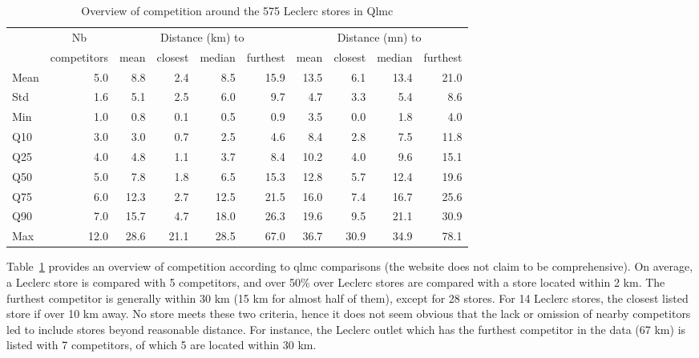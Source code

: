 \documentclass[english]{article}
\begin{document}
\begin{table}[H]
\renewcommand{\arraystretch}{0.7}%
\caption{Overview of competition around the 575 Leclerc stores in Qlmc}\label{tab:qlmc_comp}
\small
    \begin{tabular}{lr|rrrr|rrrr}
    \toprule
    \toprule
          & \multicolumn{1}{c|}{Nb} & \multicolumn{4}{c|}{Distance (km) to} & \multicolumn{4}{c}{Distance (mn) to} \\
          & \multicolumn{1}{c|}{competitors} & \multicolumn{1}{c}{mean} & \multicolumn{1}{c}{closest} & \multicolumn{1}{c}{median} & \multicolumn{1}{c|}{furthest} & \multicolumn{1}{c}{mean} & \multicolumn{1}{c}{closest} & \multicolumn{1}{c}{median} & \multicolumn{1}{c}{furthest} \\
    \midrule
    Mean  & 5.0   & 8.8   & 2.4   & 8.5   & 15.9  & 13.5  & 6.1   & 13.4  & 21.0 \\
    Std   & 1.6   & 5.1   & 2.5   & 6.0   & 9.7   & 4.7   & 3.3   & 5.4   & 8.6 \\
    Min   & 1.0   & 0.8   & 0.1   & 0.5   & 0.9   & 3.5   & 0.0   & 1.8   & 4.0 \\
    Q10   & 3.0   & 3.0   & 0.7   & 2.5   & 4.6   & 8.4   & 2.8   & 7.5   & 11.8 \\
    Q25   & 4.0   & 4.8   & 1.1   & 3.7   & 8.4   & 10.2  & 4.0   & 9.6   & 15.1 \\
    Q50   & 5.0   & 7.8   & 1.8   & 6.5   & 15.3  & 12.8  & 5.7   & 12.4  & 19.6 \\
    Q75   & 6.0   & 12.3  & 2.7   & 12.5  & 21.5  & 16.0  & 7.4   & 16.7  & 25.6 \\
    Q90   & 7.0   & 15.7  & 4.7   & 18.0  & 26.3  & 19.6  & 9.5   & 21.1  & 30.9 \\
    Max   & 12.0  & 28.6  & 21.1  & 28.5  & 67.0  & 36.7  & 30.9  & 34.9  & 78.1 \\
    \bottomrule
    \bottomrule
\end{tabular}
\end{table}

Table~\ref{tab:qlmc_comp} provides an overview of competition according to qlmc comparisons (the website does not claim to be comprehensive). On average, a Leclerc store is compared with 5 competitors, and over 50\% over Leclerc stores are compared with a store located within 2 km. The furthest competitor is generally within 30 km (15 km for almost half of them), except for 28 stores. For 14 Leclerc stores, the closest listed store if over 10 km away. No store meets these two criteria, hence it does not seem obvious that the lack or omission of nearby competitors led to include stores beyond reasonable distance. For instance, the Leclerc outlet which has the furthest competitor in the data (67 km) is listed with 7 competitors, of which 5 are located within 30 km.
\end{document}

